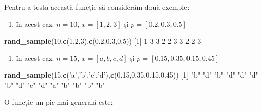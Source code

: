 \documentclass[]{article}
\newenvironment{Shaded}{\begin{snugshade}}{\end{snugshade}}
\newcommand{\KeywordTok}[1]{\textcolor[rgb]{0.13,0.29,0.53}{\textbf{#1}}}
\newcommand{\DecValTok}[1]{\textcolor[rgb]{0.00,0.00,0.81}{#1}}
\newcommand{\FloatTok}[1]{\textcolor[rgb]{0.00,0.00,0.81}{#1}}
\newcommand{\StringTok}[1]{\textcolor[rgb]{0.31,0.60,0.02}{#1}}
\newcommand{\NormalTok}[1]{#1}
\providecommand{\tightlist}{%
  \setlength{\itemsep}{0pt}\setlength{\parskip}{0pt}}
\begin{document}
Pentru a testa această funcție să considerăm două exemple:

\begin{enumerate}
\def\labelenumi{\arabic{enumi}.}
\tightlist
\item
  în acest caz: \(n=10\), \(x=[1,2,3]\) și \(p=[0.2,0.3,0.5]\)
\end{enumerate}

\begin{Shaded}
\begin{Highlighting}[]
\KeywordTok{rand_sample}\NormalTok{(}\DecValTok{10}\NormalTok{,}\KeywordTok{c}\NormalTok{(}\DecValTok{1}\NormalTok{,}\DecValTok{2}\NormalTok{,}\DecValTok{3}\NormalTok{),}\KeywordTok{c}\NormalTok{(}\FloatTok{0.2}\NormalTok{,}\FloatTok{0.3}\NormalTok{,}\FloatTok{0.5}\NormalTok{))}
\NormalTok{ [}\DecValTok{1}\NormalTok{] }\DecValTok{1} \DecValTok{3} \DecValTok{3} \DecValTok{2} \DecValTok{2} \DecValTok{3} \DecValTok{3} \DecValTok{2} \DecValTok{2} \DecValTok{3}
\end{Highlighting}
\end{Shaded}

\begin{enumerate}
\def\labelenumi{\arabic{enumi}.}
\setcounter{enumi}{1}
\tightlist
\item
  în acest caz: \(n=15\), \(x=[a,b,c,d]\) și \(p=[0.15,0.35,0.15,0.45]\)
\end{enumerate}

\begin{Shaded}
\begin{Highlighting}[]
\KeywordTok{rand_sample}\NormalTok{(}\DecValTok{15}\NormalTok{,}\KeywordTok{c}\NormalTok{(}\StringTok{'a'}\NormalTok{,}\StringTok{'b'}\NormalTok{,}\StringTok{'c'}\NormalTok{,}\StringTok{'d'}\NormalTok{),}\KeywordTok{c}\NormalTok{(}\FloatTok{0.15}\NormalTok{,}\FloatTok{0.35}\NormalTok{,}\FloatTok{0.15}\NormalTok{,}\FloatTok{0.45}\NormalTok{))}
\NormalTok{ [}\DecValTok{1}\NormalTok{] }\StringTok{"b"} \StringTok{"d"} \StringTok{"b"} \StringTok{"d"} \StringTok{"d"} \StringTok{"d"} \StringTok{"b"} \StringTok{"d"} \StringTok{"c"} \StringTok{"d"} \StringTok{"a"} \StringTok{"b"} \StringTok{"b"} \StringTok{"b"} \StringTok{"b"}
\end{Highlighting}
\end{Shaded}

O funcție un pic mai generală este:
\end{document}
